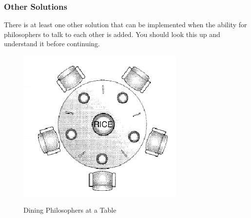 \documentclass[10pt,a4paper]{article}
\begin{document}
\subsubsection{Other Solutions}
There is at least one other solution that can be implemented when the ability for philosophers to talk to each other is added. You should look this up and understand it before continuing.
\begin{figure}
\caption{Dining Philosophers at a Table \cite{OSCONCEPTS}}
\begin{center}
\includegraphics[scale=0.45]{../images/dining.png}
\label{os}
\end{center}
\end{figure}
\end{document}

